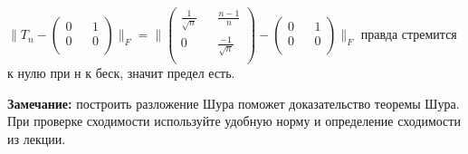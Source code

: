 \documentclass[a4paper, 11pt]{article}
\begin{document}
\begin{enumerate}
\begin{enumerate}
	$\|T_n - \begin{pmatrix}
		0 && 1 \\
		0 && 0 \\
	\end{pmatrix}\|_F = \| \begin{pmatrix}
		\frac{1}{\sqrt{n}} && \frac{n - 1}{n} \\
	0 && \frac{-1}{\sqrt{n}} \\ 
	\end{pmatrix} - \begin{pmatrix}
		0 && 1 \\
		0 && 0 \\
	\end{pmatrix}\|_F $ правда стремится к нулю при н к беск, значит предел есть.
		
		
			
		\end{enumerate}
		\textbf{Замечание:} построить разложение Шура поможет доказательство теоремы Шура. При проверке сходимости используйте удобную норму и определение сходимости из лекции. 
	\end{enumerate}
	
\end{document}
